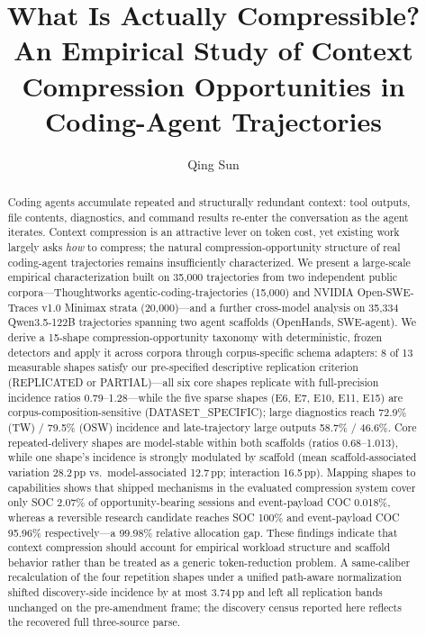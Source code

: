 ﻿\documentclass[sigconf,balance=false]{acmart}
\begin{document}
\title[What Is Actually Compressible?]{What Is Actually Compressible? An Empirical Study of Context Compression Opportunities in Coding-Agent Trajectories}

\author{Qing Sun}



\begin{abstract}
Coding agents accumulate repeated and structurally redundant context: tool outputs, file contents, diagnostics, and command results re-enter the conversation as the agent iterates. Context compression is an attractive lever on token cost, yet existing work largely asks \emph{how} to compress; the natural compression-opportunity structure of real coding-agent trajectories remains insufficiently characterized. We present a large-scale empirical characterization built on 35{,}000 trajectories from two independent public corpora---Thoughtworks agentic-coding-trajectories (15{,}000) and NVIDIA Open-SWE-Traces v1.0 Minimax strata (20{,}000)---and a further cross-model analysis on 35{,}334 Qwen3.5-122B trajectories spanning two agent scaffolds (OpenHands, SWE-agent). We derive a 15-shape compression-opportunity taxonomy with deterministic, frozen detectors and apply it across corpora through corpus-specific schema adapters: 8 of 13 measurable shapes satisfy our pre-specified descriptive replication criterion (REPLICATED or PARTIAL)---all six core shapes replicate with full-precision incidence ratios 0.79--1.28---while the five sparse shapes (E6, E7, E10, E11, E15) are corpus-composition-sensitive (DATASET\_SPECIFIC); large diagnostics reach 72.9\% (TW) / 79.5\% (OSW) incidence and late-trajectory large outputs 58.7\% / 46.6\%. Core repeated-delivery shapes are model-stable within both scaffolds (ratios 0.68--1.013), while one shape's incidence is strongly modulated by scaffold (mean scaffold-associated variation 28.2\,pp vs.\ model-associated 12.7\,pp; interaction 16.5\,pp). Mapping shapes to capabilities shows that shipped mechanisms in the evaluated compression system cover only SOC 2.07\% of opportunity-bearing sessions and event-payload COC 0.018\%, whereas a reversible research candidate reaches SOC 100\% and event-payload COC 95.96\% respectively---a 99.98\% relative allocation gap. These findings indicate that context compression should account for empirical workload structure and scaffold behavior rather than be treated as a generic token-reduction problem. A same-caliber recalculation of the four repetition shapes under a unified path-aware normalization shifted discovery-side incidence by at most 3.74\,pp and left all replication bands unchanged on the pre-amendment frame; the discovery census reported here reflects the recovered full three-source parse.
\end{abstract}
\end{document}
